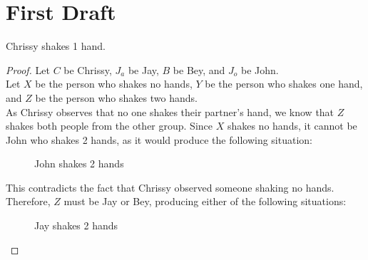 \documentclass[article, 12pt]{article}
\theoremstyle{definition}
\begin{document}
    \section*{First Draft}
    Chrissy shakes 1 hand. 
    \begin{proof}
        Let $C$ be Chrissy, $J_a$ be Jay, $B$ be Bey, and $J_o$ be John. 
        \\[12pt]
        Let $X$ be the person who shakes no hands, $Y$ be the person who shakes one hand, and $Z$ be the person who shakes two hands.
        \\[12pt]
        As Chrissy observes that no one shakes their partner's hand, we know that $Z$ shakes both people from the other group. Since $X$ shakes no hands, it cannot be John who shakes 2 hands, as it would produce the following situation:
        \begin{figure}[H]
            \centering
            \caption{John shakes 2 hands}
        \end{figure}
        This contradicts the fact that Chrissy observed someone shaking no hands. Therefore, $Z$ must be Jay or Bey, producing either of the following situations:
        \begin{figure}[H]
            \centering
            \begin{minipage}[t]{.4\textwidth}
                \centering
                \caption{Jay shakes 2 hands}
            \end{minipage}
            \begin{minipage}[t]{.4\textwidth}
                \centering
\end{minipage}
\end{figure}
\end{proof}
\end{document}
